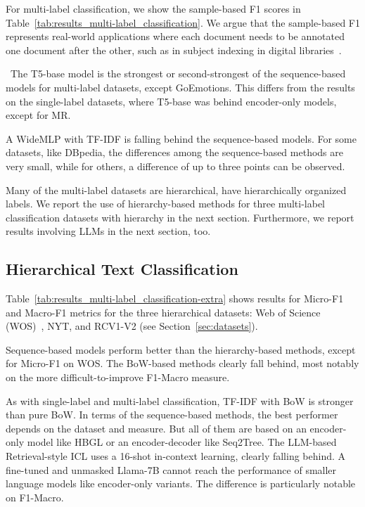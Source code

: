 \documentclass[lettersize,journal]{IEEEtran}
\newcommand{\myheader}{}
\newcommand{\LLM}{LLM\xspace}
\newcommand{\LLMs}{LLMs\xspace}
\begin{document}
\renewcommand{\myheader}{
    \caption{Micro and Macro F1 scores with standard deviation (where available) across five runs for hierarchical multi-label classification on three common benchmark datasets using Micro-F1 and Macro-F1 scores.}\label{tab:results_multi-label_classification-extra}
}


For multi-label classification, we show the sample-based F1 scores in Table~\ref{tab:results_multi-label_classification}.
We argue that the sample-based F1 represents real-world applications where each document needs to be annotated one document after the other, such as in subject indexing in digital libraries~\cite{DBLP:conf/kcap/GalkeMSBS17,DBLP:conf/jcdl/MaiGS18}.  

\
The T5-base model is the strongest or second-strongest of the sequence-based models for multi-label datasets, except GoEmotions.
This differs from the results on the single-label datasets, where T5-base was behind encoder-only models, except for MR.

A WideMLP with TF-IDF is falling behind the sequence-based models. 
For some datasets, like DBpedia, the differences among the sequence-based methods are very small, while for others, a difference of up to three points can be observed. 

Many of the multi-label datasets are hierarchical, \ie have hierarchically organized labels.
We report the use of hierarchy-based methods for three multi-label classification datasets with hierarchy in the next section.
Furthermore, we report results involving \LLMs in the next section, too. 

\subsection{Hierarchical Text Classification}
Table~\ref{tab:results_multi-label_classification-extra} shows results for Micro-F1 and Macro-F1 metrics for the three hierarchical datasets: Web of Science (WOS)~\cite{DBLP:conf/icmla/KowsariBHMGB17}, NYT, and RCV1-V2 (see Section~\ref{sec:datasets}).

Sequence-based models perform better than the hierarchy-based methods, except for Micro-F1 on WOS. 
The BoW-based methods clearly fall behind, most notably on the more difficult-to-improve F1-Macro measure.

As with single-label and multi-label classification, TF-IDF with BoW is stronger than pure BoW.
In terms of the sequence-based methods, the best performer depends on the dataset and measure.
But all of them are based on an encoder-only model like HBGL or an encoder-decoder like Seq2Tree.
The \LLM-based Retrieval-style ICL uses a 16-shot in-context learning, clearly falling behind.
A fine-tuned and unmasked Llama-7B cannot reach the performance of smaller language models like encoder-only variants.
The difference is particularly notable on F1-Macro.
\end{document}
